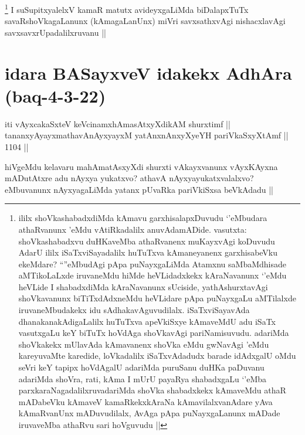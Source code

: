 \begin{artha}
\footnote{ililx shoVkashabadxdiMda kAmavu garxhisalapxDuvudu `\stext'eMbudara athaRvanunx \stext'eMdu vAtiRkadalilx anuvAdamADide. vasutxta: shoVkashabadxvu duHKaveMba athaRvanenx muKayxvAgi koDuvudu AdarU ililx iSaTxviSayadalilx huTuTxva kAmaneyanenx garxhisabeVku ekeMdare? ``\stext''eMbudAgi pApa puNayxgaLiMda Atamxnu saMbaMdhisade aMTikoLaLxde iruvaneMdu hiMde heVLidadxkekx kAraNavanunx `\stext'eMdu heVLide I shabadxdiMda kAraNavanunx sUciside, yathAshurxtavAgi shoVkavanunx biTiTxdAdxneMdu heVLidare pApa puNayxgaLu aMTilalxde iruvaneMbudakekx idu sAdhakavAguvudilalx. iSaTxviSayavAda dhanakanakAdigaLalilx huTuTxva apeVkiSxye kAmaveMdU adu iSaTx vasutxgaLu keY biTuTx hoVdAga shoVkavAgi pariNamisuvudu. adariMda shoVkakekx mUlavAda kAmavanenx shoVka eMdu gwNavAgi \stext'eMdu kareyuvaMte karedide, loVkadalilx iSaTxvAdadudx barade idAdxgalU oMdu seVri keY tapipx hoVdAgalU adariMda puruSanu duHKa paDuvanu adariMda shoVra, rati, kAma I mUrU payaRya shabadxgaLu `\stext'eMba parxkaraNagadalilxruvadariMda shoVka shabadxkekx kAmaveMdu athaR mADabeVku kAmaveV kamaRkekxkAraNa kAmavilalxvanAdare yAva kAmaRvanUnx mADuvudilalx, AvAga pApa puNayxgaLanunx mADade iruvaveMba athaRvu sari hoVguvudu ||}
I suSupitxyalelxV kamaR matutx avideyxgaLiMda biDalapxTuTx savaRshoVkagaLanunx (kAmagaLanUnx) miVri savxsathxvAgi nishacxlavAgi savxsavxrUpadalilxruvanu ||
\end{artha}

\section*{idara BASayxveV idakekx AdhAra (baq-4-3-22)}


\begin{shl}
iti vAyxcakaSxteV keVcinamxhAmasAtxyXdikAM shurxtimf || \\
tananxyAyayxmathavA\s nAyxyayxM yatAnxnAnxyXyeYH pariVkaSxyXtAmf ||  1104 ||  
\end{shl}

\begin{artha}
hiVgeMdu kelavaru mahAmatAsxyXdi shurxti vAkayxvanunx vAyxKAyxna mADutAtxre adu nAyxya yukatxvo? athavA nAyxyayukatxvalalxvo? eMbuvanunx nAyxyagaLiMda yatanx pUvaRka pariVkiSxsa beVkAdadu ||
\end{artha}


